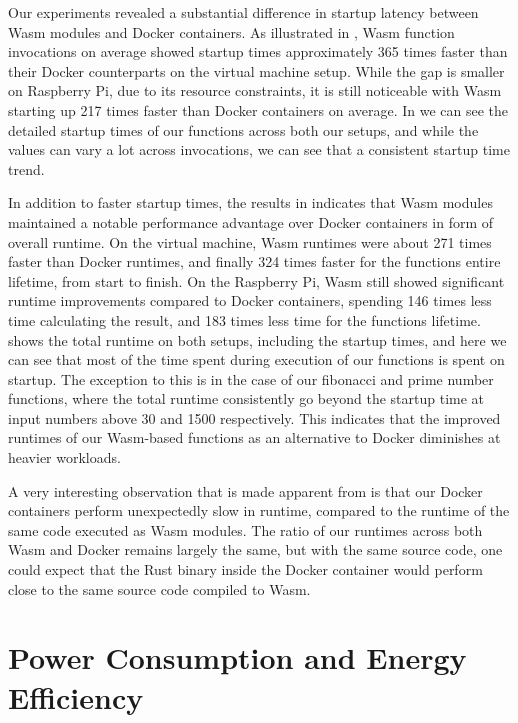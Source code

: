 \documentclass[
  table]{report}
\begin{document}
Our experiments revealed a substantial difference in startup latency
between \ac{Wasm} modules and Docker containers. As illustrated in
, \ac{Wasm} function invocations on
average showed startup times approximately 365 times faster than their
Docker counterparts on the virtual machine setup. While the gap is
smaller on Raspberry Pi, due to its resource constraints, it is still
noticeable with \ac{Wasm} starting up 217 times faster than Docker
containers on average. In 
we can see the detailed startup times of our functions across both our
setups, and while the values can vary a lot across invocations, we can
see that a consistent startup time trend.

In addition to faster startup times, the results in
 indicates that \ac{Wasm} modules
maintained a notable performance advantage over Docker containers in
form of overall runtime. On the virtual machine, \ac{Wasm} runtimes were
about 271 times faster than Docker runtimes, and finally 324 times
faster for the functions entire lifetime, from start to finish. On the
Raspberry Pi, \ac{Wasm} still showed significant runtime improvements
compared to Docker containers, spending 146 times less time calculating
the result, and 183 times less time for the functions lifetime.
 shows the total runtime on
both setups, including the startup times, and here we can see that most
of the time spent during execution of our functions is spent on startup.
The exception to this is in the case of our fibonacci and prime number
functions, where the total runtime consistently go beyond the startup
time at input numbers above 30 and 1500 respectively. This indicates
that the improved runtimes of our \ac{Wasm}-based functions as an
alternative to Docker diminishes at heavier workloads.

A very interesting observation that is made apparent from
 is that our Docker containers perform
unexpectedly slow in runtime, compared to the runtime of the same code
executed as \ac{Wasm} modules. The ratio of our runtimes across both
\ac{Wasm} and Docker remains largely the same, but with the same source
code, one could expect that the Rust binary inside the Docker container
would perform close to the same source code compiled to \ac{Wasm}.

\section{Power Consumption and Energy Efficiency}
\end{document}
